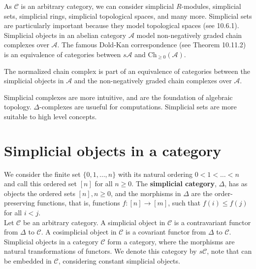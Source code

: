 As $\mathcal{C}$ is an arbitrary category, we can consider simplicial $R$-modules, simplicial sets, simplicial rings, simplicial topological spaces, and many more. Simplicial sets are particularly important because they model topological spaces (see 10.6.1). Simplicial objects in an abelian category $\mathcal{A}$ model non-negatively graded chain complexes over $\mathcal{A}$. The famous Dold-Kan correspondence (see Theorem 10.11.2) is an equivalence of categories between $s \mathcal{A}$ and $\mathrm{Ch}_{\geq 0}(\mathcal{A})$.

\begin{theo}
The normalized chain complex is part of an equivalence of categories between the simplicial objects in $\mathcal{A}$ and the non-negatively graded chain complexes over $\mathcal{A}$.   
\end{theo}

Simplicial complexes are more intuitive, and are the foundation of algebraic topology. $\Delta$-complexes are usueful for computations. Simplicial sets are more suitable to high level concepts.

\section{Simplicial objects in a category}

We consider the finite set $\{0,1, \ldots, n\}$ with its natural ordering $0<1<\ldots<n$ and call this ordered set $[n]$ for all $n \geq 0$. The \textbf{simplicial category}, $\Delta$, has as objects the ordered sets $[n], n \geq 0$, and the morphisms in $\Delta$ are the order-preserving functions, that is, functions $f:[n] \rightarrow[m]$, such that $f(i) \leq f(j)$ for all $i<j$.\\
Let $\mathcal{C}$ be an arbitrary category. A simplicial object in $\mathcal{C}$ is a contravariant functor from $\Delta$ to $\mathcal{C}$. A cosimplicial object in $\mathcal{C}$ is a covariant functor from $\Delta$ to $\mathcal{C}$.\\
Simplicial objects in a category $\mathcal{C}$ form a category, where the morphisms are natural transformations of functors. We denote this category by $s \mathcal{C}$, note that \cc can be embedded in $\mathcal{C}$, considering constant simplicial objects.\\




